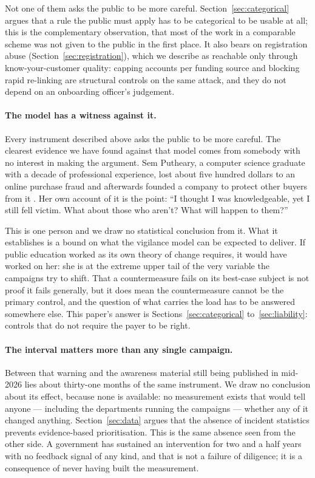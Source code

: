 \documentclass[10pt,a4paper,twocolumn]{article}
\begin{document}
Not one of them asks the public to be more careful. Section~\ref{sec:categorical}
argues that a rule the public must apply has to be categorical to be usable at
all; this is the complementary observation, that most of the work in a
comparable scheme was not given to the public in the first place. It also bears
on registration abuse (Section~\ref{sec:registration}), which we describe as
reachable only through know-your-customer quality: capping accounts per funding
source and blocking rapid re-linking are structural controls on the same attack,
and they do not depend on an onboarding officer's judgement.

\paragraph{The model has a witness against it.} Every instrument described
above asks the public to be more careful. The clearest evidence we have found
against that model comes from somebody with no interest in making the argument.
Sem Putheary, a computer science graduate with a decade of professional
experience, lost about five hundred dollars to an online purchase fraud and
afterwards founded a company to protect other buyers from it
\citep{wingbank2025espass}. Her own account of it is the point: ``I thought I
was knowledgeable, yet I still fell victim. What about those who aren't? What
will happen to them?''

This is one person and we draw no statistical conclusion from it. What it
establishes is a bound on what the vigilance model can be expected to deliver.
If public education worked as its own theory of change requires, it would have
worked on her: she is at the extreme upper tail of the very variable the
campaigns try to shift. That a countermeasure fails on its best-case subject is
not proof it fails generally, but it does mean the countermeasure cannot be the
primary control, and the question of what carries the load has to be answered
somewhere else. This paper's answer is Sections~\ref{sec:categorical}
to~\ref{sec:liability}: controls that do not require the payer to be right.

\paragraph{The interval matters more than any single campaign.}
Between that warning and the awareness material still being published in
mid-2026 lies about thirty-one months of the same instrument. We draw no
conclusion about its effect, because none is available: no measurement exists
that would tell anyone --- including the departments running the campaigns ---
whether any of it changed anything. Section~\ref{sec:data} argues that the
absence of incident statistics prevents evidence-based prioritisation. This is
the same absence seen from the other side. A government has sustained an
intervention for two and a half years with no feedback signal of any kind, and
that is not a failure of diligence; it is a consequence of never having built
the measurement.
\end{document}
